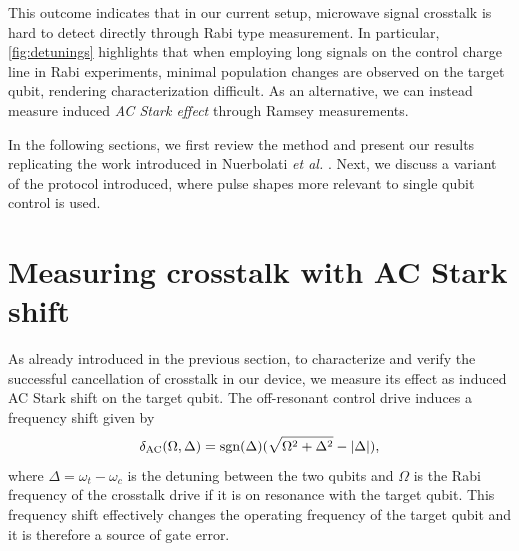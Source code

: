 This outcome indicates that in our current setup, microwave signal crosstalk is hard to detect directly through Rabi type measurement.
In particular, \cref{fig:detunings} highlights that when employing long signals on the control charge line in Rabi experiments, minimal population changes are observed on the target qubit, rendering characterization difficult.
As an alternative, we can instead measure induced \emph{AC Stark effect} \cite{AC_starl} through Ramsey measurements.

In the following sections, we first review the method and present our results replicating the work introduced in Nuerbolati \emph{et al.} \cite{crosstalk}.
Next, we discuss a variant of the protocol introduced, where pulse shapes more relevant to single qubit control is used. 



\section{Measuring crosstalk with AC Stark shift}

As already introduced in the previous section, to characterize and verify the successful cancellation of crosstalk in our device, we measure its effect as induced AC Stark shift on the target qubit.
The off-resonant control drive induces a frequency shift given by
\begin{equation}
\label{eq:stark_ac}
    \delta_{\text{AC}} (\Omega, \Delta) = 
    \text{sgn} (\Delta) ( \sqrt{\Omega^2 + \Delta^2} - |\Delta|) ,
\end{equation}
where $\Delta = \omega_t - \omega_c$ is the detuning between the two qubits and $\Omega$ is the Rabi frequency of the crosstalk drive if it is on resonance with the target qubit.
This frequency shift effectively changes the operating frequency of the target qubit and it is therefore a source of gate error.


